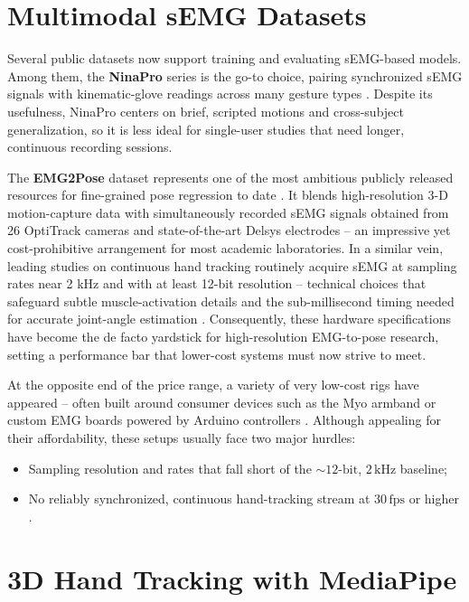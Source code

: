 \section{Multimodal sEMG Datasets}

Several public datasets now support training and evaluating sEMG-based models. Among them, the \textbf{NinaPro} series is the go-to choice, pairing synchronized sEMG signals with kinematic-glove readings across many gesture types \cite{zia2018multiday}. Despite its usefulness, NinaPro centers on brief, scripted motions and cross-subject generalization, so it is less ideal for single-user studies that need longer, continuous recording sessions.

The \textbf{EMG2Pose} dataset represents one of the most ambitious publicly released resources for fine-grained pose regression to date \cite{salter2024emg2pose}. It blends high-resolution 3-D motion-capture data with simultaneously recorded sEMG signals obtained from 26 OptiTrack cameras and state-of-the-art Delsys electrodes -- an impressive yet cost-prohibitive arrangement for most academic laboratories. In a similar vein, leading studies on continuous hand tracking routinely acquire sEMG at sampling rates near 2 kHz and with at least 12-bit resolution -- technical choices that safeguard subtle muscle-activation details and the sub-millisecond timing needed for accurate joint-angle estimation \cite{salter2024emg2pose, zanghieri2023semg, lee2022explainable}. Consequently, these hardware specifications have become the de facto yardstick for high-resolution EMG-to-pose research, setting a performance bar that lower-cost systems must now strive to meet.

At the opposite end of the price range, a variety of very low-cost rigs have appeared -- often built around consumer devices such as the Myo armband or custom EMG boards powered by Arduino controllers \cite{nasri2020semg}. Although appealing for their affordability, these setups usually face two major hurdles:
\begin{itemize}
    \item Sampling resolution and rates that fall short of the \(\sim\!12\text{-bit}\), \(2\,\text{kHz}\) baseline;
    \item No reliably synchronized, continuous hand-tracking stream at \(30\,\text{fps}\) or higher \cite{graf2023combining}.
\end{itemize}

\section{3D Hand Tracking with MediaPipe}

